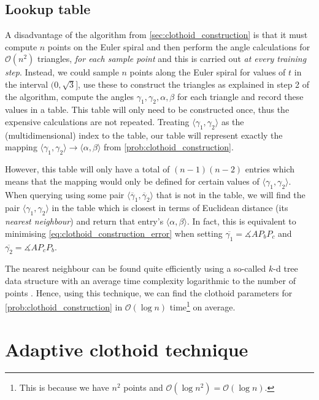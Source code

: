 \subsection{Lookup table}
A disadvantage of the algorithm from \ref{sec:clothoid_construction} is that it must compute $n$ points on the Euler spiral and then perform the angle calculations for $\mathcal{O}(n^2)$ triangles, \textit{for each sample point} and this is carried out \textit{at every training step}.
Instead, we could sample $n$ points along the Euler spiral for values of $t$ in the interval $(0, \sqrt{3}]$, use these to construct the triangles as explained in step 2 of the algorithm, compute the angles $\gamma_1,\gamma_2,\alpha,\beta$ for each triangle and record these values in a table.
This table will only need to be constructed once, thus the expensive calculations are not repeated.
Treating $\langle\gamma_1,\gamma_2\rangle$ as the (multidimensional) index to the table, our table will represent exactly the mapping $\langle\gamma_1,\gamma_2\rangle\rightarrow\langle\alpha,\beta\rangle$ from \ref{prob:clothoid_construction}.

However, this table will only have a total of $(n-1)(n-2)$ entries which means that the mapping would only be defined for certain values of $\langle\gamma_1,\gamma_2\rangle$.
When querying using some pair $\langle\overline{\gamma}_1,\overline{\gamma}_2\rangle$ that is not in the table, we will find the pair $\langle\gamma_1,\gamma_2\rangle$ in the table which is closest in terms of Euclidean distance (its \textit{nearest neighbour}) and return that entry's $\langle \alpha,\beta\rangle$.
In fact, this is equivalent to minimising \ref{eq:clothoid_construction_error} when setting $\overline{\gamma_1} = \measuredangle{AP_bP_c}$ and $\overline{\gamma_2} = \measuredangle{AP_cP_b}$.

The nearest neighbour can be found quite efficiently using a so-called $k$-d tree data structure with an average time complexity logarithmic to the number of points \cite{friedman1977}.
Hence, using this technique, we can find the clothoid parameters for \ref{prob:clothoid_construction} in $\mathcal{O}(\log n)$ time\footnote{This is because we have $n^2$ points and $\mathcal{O}(\log{n^2})=\mathcal{O}(\log n)$.} on average.

\section{Adaptive clothoid technique}
\todo

